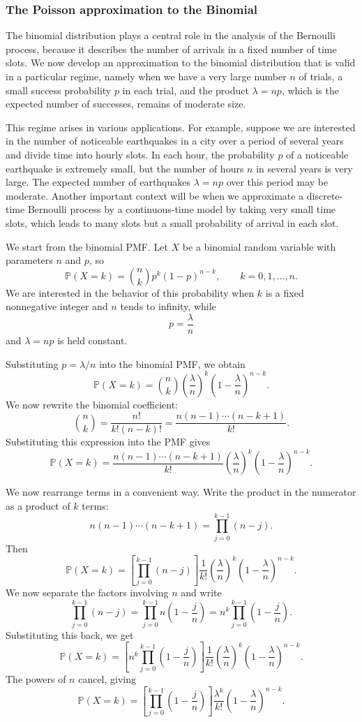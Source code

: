 \subsubsection{The Poisson approximation to the Binomial}

The binomial distribution plays a central role in the analysis of the Bernoulli process, because it describes the number of arrivals in a fixed number of time slots.  
We now develop an approximation to the binomial distribution that is valid in a particular regime, namely when we have a very large number \(n\) of trials, a small success probability \(p\) in each trial, and the product \(\lambda = np\), which is the expected number of successes, remains of moderate size.  

This regime arises in various applications.  
For example, suppose we are interested in the number of noticeable earthquakes in a city over a period of several years and divide time into hourly slots.  
In each hour, the probability \(p\) of a noticeable earthquake is extremely small, but the number of hours \(n\) in several years is very large.  
The expected number of earthquakes \(\lambda = np\) over this period may be moderate.  
Another important context will be when we approximate a discrete-time Bernoulli process by a continuous-time model by taking very small time slots, which leads to many slots but a small probability of arrival in each slot.  

We start from the binomial PMF.  
Let \(X\) be a binomial random variable with parameters \(n\) and \(p\), so
\[
\mathbb{P}(X = k)
=
\binom{n}{k} p^{k} (1-p)^{n-k},
\qquad
k = 0,1,\ldots,n.
\]
We are interested in the behavior of this probability when \(k\) is a fixed nonnegative integer and \(n\) tends to infinity, while
\[
p = \frac{\lambda}{n}
\]
and \(\lambda = np\) is held constant.  

Substituting \(p = \lambda/n\) into the binomial PMF, we obtain
\[
\mathbb{P}(X = k)
=
\binom{n}{k}
\left(\frac{\lambda}{n}\right)^{k}
\left(1 - \frac{\lambda}{n}\right)^{n-k}.
\]
We now rewrite the binomial coefficient:
\[
\binom{n}{k}
=
\frac{n!}{k!(n-k)!}
=
\frac{n (n-1) \cdots (n-k+1)}{k!}.
\]
Substituting this expression into the PMF gives
\[
\mathbb{P}(X = k)
=
\frac{n (n-1) \cdots (n-k+1)}{k!}
\left(\frac{\lambda}{n}\right)^{k}
\left(1 - \frac{\lambda}{n}\right)^{n-k}.
\]

We now rearrange terms in a convenient way.  
Write the product in the numerator as a product of \(k\) terms:
\[
n (n-1) \cdots (n-k+1)
=
\prod_{j=0}^{k-1} (n-j).
\]
Then
\[
\mathbb{P}(X = k)
=
\left[\prod_{j=0}^{k-1} (n-j)\right]
\frac{1}{k!}
\left(\frac{\lambda}{n}\right)^{k}
\left(1 - \frac{\lambda}{n}\right)^{n-k}.
\]
We now separate the factors involving \(n\) and write
\[
\prod_{j=0}^{k-1} (n-j)
=
\prod_{j=0}^{k-1} n \left(1 - \frac{j}{n}\right)
=
n^{k}
\prod_{j=0}^{k-1} \left(1 - \frac{j}{n}\right).
\]
Substituting this back, we get
\[
\mathbb{P}(X = k)
=
\left[
n^{k}
\prod_{j=0}^{k-1} \left(1 - \frac{j}{n}\right)
\right]
\frac{1}{k!}
\left(\frac{\lambda}{n}\right)^{k}
\left(1 - \frac{\lambda}{n}\right)^{n-k}.
\]
The powers of \(n\) cancel, giving
\[
\mathbb{P}(X = k)
=
\left[\prod_{j=0}^{k-1} \left(1 - \frac{j}{n}\right)\right]
\frac{\lambda^{k}}{k!}
\left(1 - \frac{\lambda}{n}\right)^{n-k}.
\]

